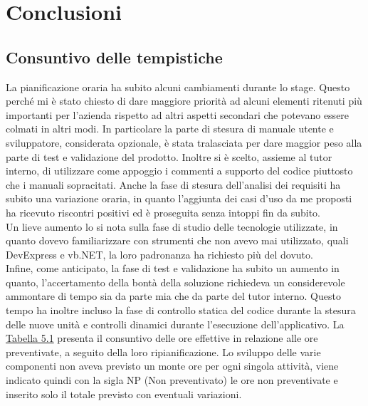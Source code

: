 
\chapter{Conclusioni}
\label{cap:conclusioni}
\section{Consuntivo delle tempistiche}
\label{tempistiche}
La pianificazione oraria ha subito alcuni cambiamenti durante lo stage. Questo perché mi è stato chiesto di dare maggiore priorità ad alcuni elementi ritenuti 
più importanti per l'azienda rispetto ad altri aspetti secondari che potevano essere colmati in altri modi. In particolare la parte di stesura di manuale utente e sviluppatore,
considerata opzionale, è stata tralasciata per dare maggior peso alla parte di test e validazione del prodotto. Inoltre si è scelto, assieme al tutor interno, di utilizzare
come appoggio i commenti a supporto del codice piuttosto che i manuali sopracitati. Anche la fase di stesura dell'analisi dei requisiti ha subito una variazione oraria, in quanto
l'aggiunta dei casi d'uso da me proposti ha ricevuto riscontri positivi ed è proseguita senza intoppi fin da subito.\\ Un lieve aumento lo si nota sulla fase di studio delle
tecnologie utilizzate, in quanto dovevo familiarizzare con strumenti che non avevo mai utilizzato, quali DevExpress e vb.NET, la loro padronanza ha richiesto più del dovuto.\\
Infine, come anticipato, la fase di test e validazione ha subito un aumento in quanto, l'accertamento della bontà della soluzione richiedeva un considerevole ammontare di tempo
sia da parte mia che da parte del tutor interno. Questo tempo ha inoltre incluso la fase di controllo statica del codice durante la stesura delle nuove unità e controlli dinamici
durante l'esecuzione dell'applicativo.
La \hyperref[effettive]{Tabella 5.1} presenta il consuntivo delle ore effettive in relazione alle ore preventivate, a seguito della loro ripianificazione.
Lo sviluppo delle varie componenti non aveva previsto un monte ore per ogni singola attività, viene indicato quindi con la sigla NP (Non preventivato) le ore non preventivate e 
inserito solo il totale previsto con eventuali variazioni.
\newpage


